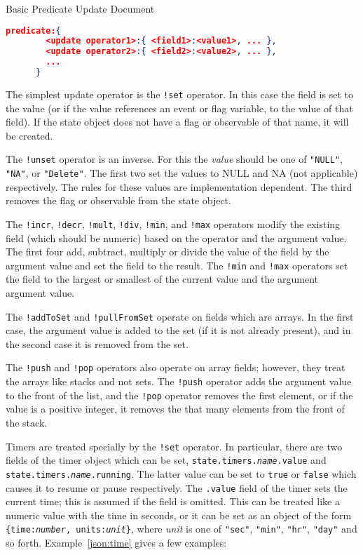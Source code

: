 \documentclass{article}
\begin{document}
  \begin{algorithm}
    \caption{Basic Predicate Update Document}
    \label{json:pred}
    \begin{lstlisting}[language=json]
      predicate:{
        <update operator1>:{ <field1>:<value1>, ... },
        <update operator2>:{ <field2>:<value2>, ... },
        ...
      }
    \end{lstlisting}
  \end{algorithm}

  The simplest update operator is the \texttt{!set} operator.  In
  this case the field is set to the value (or if the value references
  an event or flag variable, to the value of that field).  If the
  state object does not have a flag or observable of that name, it
  will be created. 

  The \texttt{!unset} operator is an inverse.  For this the
  \textit{value} should be one of \texttt{"NULL"}, \texttt{"NA"}, or
  \texttt{"Delete"}.  The first two set the values to NULL and NA (not
  applicable) respectively.  The rules for these values are
  implementation dependent.  The third removes the flag or observable
  from the state object.

  The \texttt{!incr}, \texttt{!decr}, \texttt{!mult},
  \texttt{!div}, \texttt{!min}, and \texttt{!max} operators modify
  the existing field (which should be numeric) based on the operator
  and the argument value.  The first four add, subtract, multiply or
  divide the value of the field by the argument value and set the
  field to the result.   The \texttt{!min} and \texttt{!max}
  operators set the field to the largest or smallest of the current
  value and the argument argument value.

  The \texttt{!addToSet} and \texttt{!pullFromSet} operate on fields
  which are arrays.  In the first case, the argument value is added to
  the set (if it is not already present), and in the second case it is
  removed from the set.

  The \texttt{!push} and \texttt{!pop} operators also operate on
  array fields; however, they treat the arrays like stacks and not
  sets.  The \texttt{!push} operator adds the argument value to the
  front of the list, and the \texttt{!pop} operator removes the first
  element, or if the value is a positive integer, it removes the that
  many elements from the front of the stack.

  Timers are treated specially by the \texttt{!set} operator.  In
  particular, there are two fields of the timer object which can be
  set, \texttt{state.timers.\textit{name}.value} and
  \texttt{state.timers.\textit{name}.running}.  The latter value can
  be set to \texttt{true} or \texttt{false} which causes it to resume
  or pause respectively.  The \texttt{.value} field of the timer sets
  the current time; this is assumed if the field is omitted.  This can
  be treated like a numeric value with the time in seconds, or it can
  be set as an object of the form \texttt{\{time:\textit{number},
    units:\textit{unit}\}}, where \textit{unit} is one of
  \texttt{"sec"}, \texttt{"min"}, \texttt{"hr"}, \texttt{"day"} and so
  forth.  Example~\ref{json:time} gives a few examples:
  
\end{document}
